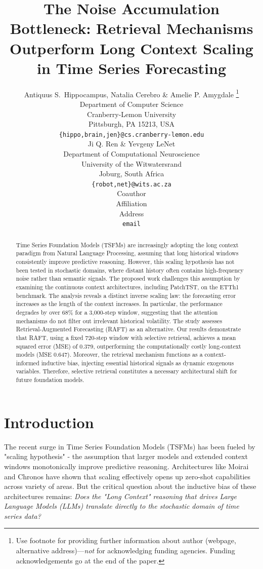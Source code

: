\documentclass{article} %
\title{The Noise Accumulation Bottleneck: Retrieval Mechanisms Outperform Long Context Scaling in Time Series Forecasting}
\author{Antiquus S.~Hippocampus, Natalia Cerebro \& Amelie P. Amygdale \thanks{ Use footnote for providing further information
about author (webpage, alternative address)---\emph{not} for acknowledging
funding agencies.  Funding acknowledgements go at the end of the paper.} \\
Department of Computer Science\\
Cranberry-Lemon University\\
Pittsburgh, PA 15213, USA \\
\texttt{\{hippo,brain,jen\}@cs.cranberry-lemon.edu} \\
\And
Ji Q. Ren \& Yevgeny LeNet \\
Department of Computational Neuroscience \\
University of the Witwatersrand \\
Joburg, South Africa \\
\texttt{\{robot,net\}@wits.ac.za} \\
\AND
Coauthor \\
Affiliation \\
Address \\
\texttt{email}
}
\begin{document}
\maketitle

\begin{abstract}
Time Series Foundation Models (TSFMs) are increasingly adopting the long context paradigm from Natural Language Processing, assuming that long historical windows consistently improve predictive reasoning. However, this scaling hypothesis has not been tested in stochastic domains, where distant history often contains high-frequency noise rather than semantic signals. The proposed work challenges this assumption by examining the continuous context architectures, including PatchTST, on the ETTh1 benchmark. The analysis reveals a distinct inverse scaling law: the forecasting error increases as the length of the context increases. In particular, the performance degrades by over 68\% for a 3,000-step window, suggesting that the attention mechanisms do not filter out irrelevant historical volatility. The study assesses Retrieval-Augmented Forecasting (RAFT) as an alternative. Our results demonstrate that RAFT, using a fixed 720-step window with selective retrieval, achieves a mean squared error (MSE) of 0.379, outperforming the computationally costly long-context models (MSE 0.647). Moreover, the retrieval mechanism functions as a context-informed inductive bias, injecting essential historical signals as dynamic exogenous variables. Therefore, selective retrieval constitutes a necessary architectural shift for future foundation models.
\end{abstract}

\section{Introduction}

The recent surge in Time Series Foundation Models (TSFMs) has been fueled by "scaling hypothesis" - the assumption that larger models and extended context windows monotonically improve predictive reasoning. Architectures like Moirai \citep{woo2024unified} and Chronos \citep{ansari2024chronos} have shown that scaling effectively opens up zero-shot capabilities across variety of areas. But the critical question about the inductive bias of these architectures remains: \textit{Does the "Long Context" reasoning that drives Large Language Models (LLMs) translate directly to the stochastic domain of time series data?}
\end{document}
